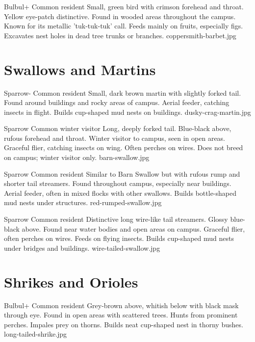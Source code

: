 \documentclass[aspectratio=169]{beamer}
\begin{document}
{Bulbul+}
{Common resident}
{Small, green bird with crimson forehead and throat. Yellow eye-patch distinctive.}
{Found in wooded areas throughout the campus.}
{Known for its metallic 'tuk-tuk-tuk' call. Feeds mainly on fruits, especially figs.}
{Excavates nest holes in dead tree trunks or branches.}
{coppersmith-barbet.jpg}

\section{Swallows and Martins}
{Sparrow-}
{Common resident}
{Small, dark brown martin with slightly forked tail.}
{Found around buildings and rocky areas of campus.}
{Aerial feeder, catching insects in flight.}
{Builds cup-shaped mud nests on buildings.}
{dusky-crag-martin.jpg}

{Sparrow}
{Common winter visitor}
{Long, deeply forked tail. Blue-black above, rufous forehead and throat.}
{Winter visitor to campus, seen in open areas.}
{Graceful flier, catching insects on wing. Often perches on wires.}
{Does not breed on campus; winter visitor only.}
{barn-swallow.jpg}

{Sparrow}
{Common resident}
{Similar to Barn Swallow but with rufous rump and shorter tail streamers.}
{Found throughout campus, especially near buildings.}
{Aerial feeder, often in mixed flocks with other swallows.}
{Builds bottle-shaped mud nests under structures.}
{red-rumped-swallow.jpg}

{Sparrow}
{Common resident}
{Distinctive long wire-like tail streamers. Glossy blue-black above.}
{Found near water bodies and open areas on campus.}
{Graceful flier, often perches on wires. Feeds on flying insects.}
{Builds cup-shaped mud nests under bridges and buildings.}
{wire-tailed-swallow.jpg}

\section{Shrikes and Orioles}
{Bulbul+}
{Common resident}
{Grey-brown above, whitish below with black mask through eye.}
{Found in open areas with scattered trees.}
{Hunts from prominent perches. Impales prey on thorns.}
{Builds neat cup-shaped nest in thorny bushes.}
{long-tailed-shrike.jpg}
\end{document}
